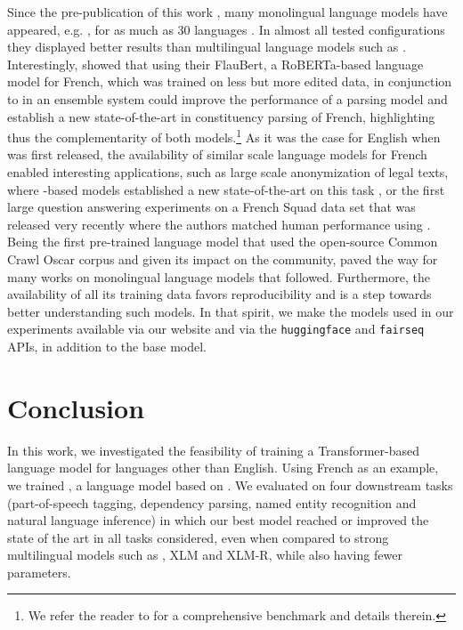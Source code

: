 Since the pre-publication of this work \cite{martinetal2019Camembert},
many monolingual language models have appeared, e.g.
\cite{le_at_al2019flaubert,FinBert2019,RobBERT2020}, for as much as 30
languages \cite{horvyteam:2020:arxiv}. In almost all tested
configurations they displayed better results than multilingual
language models such as \mbert \cite{pires_et_al2019multilingual}.
Interestingly,  showed that using their
FlauBert, a RoBERTa-based language model for French, which was trained on less
but more edited data, in conjunction to \camembert in an ensemble
system could improve the performance of a parsing model and  establish
a new state-of-the-art in constituency parsing of French, highlighting thus
the complementarity of both models.\footnote{We refer the reader to
    \cite{le_at_al2019flaubert} for a comprehensive benchmark and details
    therein.}
As it was the case for English when \bert was first released, the
availability of similar scale language models for French enabled
interesting applications, such as large scale anonymization of legal
texts, where \camembert-based models established a new
state-of-the-art on this task \cite{bennesty:2019:anonym}, or the first
large question answering experiments on a French Squad data set that
was released very recently \cite{fquad:2020:arXiv} where the authors matched human performance using \camembertlarge.
Being the first pre-trained language model that used the open-source Common Crawl Oscar
corpus and given its impact on the community,
\camembert paved the way for many works on monolingual language
models that followed. Furthermore, the availability of all its
training data favors reproducibility and is a step towards better
understanding such models.
In that spirit, we make the models used in our experiments available via our website and via the \texttt{huggingface} and \texttt{fairseq} APIs, in addition to the base \camembert model.

\section{Conclusion}
In this work, we investigated the feasibility of training a
Transformer-based language model for languages other than English.
Using French as an example, we trained \camembert, a language model
based on \roberta.
We evaluated \camembert on four downstream tasks
(part-of-speech tagging, dependency parsing, named entity recognition
and natural language inference) in which our best model reached or improved the state of the art in all tasks
considered, even when compared to strong multilingual models such as
\mbert, XLM and XLM-R, while also having fewer parameters.

